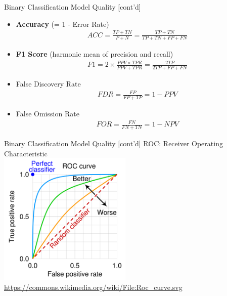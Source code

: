 \documentclass[ignorenonframetext,xcolor=x11names]{beamer}
\begin{document}
\begin{frame}{Binary Classification Model Quality \small [cont'd]}
\begin{itemize}
   \item \textbf{Accuracy} (= 1 - Error Rate)
\begin{align*}
ACC = \frac{TP+TN}{P+N} = \frac{TP + TN}{TP + TN + FP + FN}
\end{align*}
   \item \textbf{F1 Score} (harmonic mean of precision and recall)
\begin{align*}
F1 = 2 \times \frac{PPV \times TPR}{PPV + TPR} = \frac{2 TP}{2TP + FP + FN}
\end{align*}
   \item False Discovery Rate
\begin{align*}
FDR = \frac{FP}{FP+TP} = 1 - PPV
\end{align*}
   \item False Omission Rate
\begin{align*}
FOR = \frac{FN}{FN+TN} = 1 - NPV
\end{align*}
\end{itemize}
\end{frame}      

\begin{frame}{Binary Classification Model Quality \small [cont'd]}
\large ROC: Receiver Operating Characteristic \\

\normalsize
\centering
\includegraphics[height=2.5in]{roc.png}
\scriptsize \url{https://commons.wikimedia.org/wiki/File:Roc_curve.svg}
\end{frame}
\end{document}
